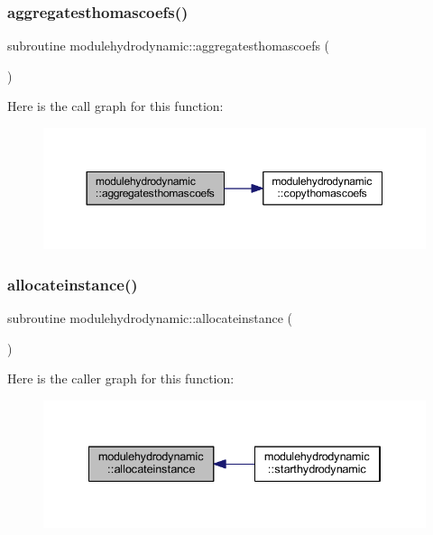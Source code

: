 \subsubsection{\texorpdfstring{aggregatesthomascoefs()}{aggregatesthomascoefs()}}
{\footnotesize\ttfamily subroutine modulehydrodynamic\+::aggregatesthomascoefs (\begin{DoxyParamCaption}{ }\end{DoxyParamCaption})\hspace{0.3cm}{\ttfamily [private]}}

Here is the call graph for this function\+:\nopagebreak
\begin{figure}[H]
\begin{center}
\leavevmode
\includegraphics[width=350pt]{namespacemodulehydrodynamic_a0d43e324a40d96741fa99e647c0d0e01_cgraph}
\end{center}
\end{figure}
\mbox{\label{namespacemodulehydrodynamic_aacffef10ed59e5eb96916e7a72dbff26}} 
\subsubsection{\texorpdfstring{allocateinstance()}{allocateinstance()}}
{\footnotesize\ttfamily subroutine modulehydrodynamic\+::allocateinstance (\begin{DoxyParamCaption}{ }\end{DoxyParamCaption})\hspace{0.3cm}{\ttfamily [private]}}

Here is the caller graph for this function\+:\nopagebreak
\begin{figure}[H]
\begin{center}
\leavevmode
\includegraphics[width=334pt]{namespacemodulehydrodynamic_aacffef10ed59e5eb96916e7a72dbff26_icgraph}
\end{center}
\end{figure}
\mbox{\label{namespacemodulehydrodynamic_a0f6a249ae16b4abbfcead3fdc4641a89}} 
